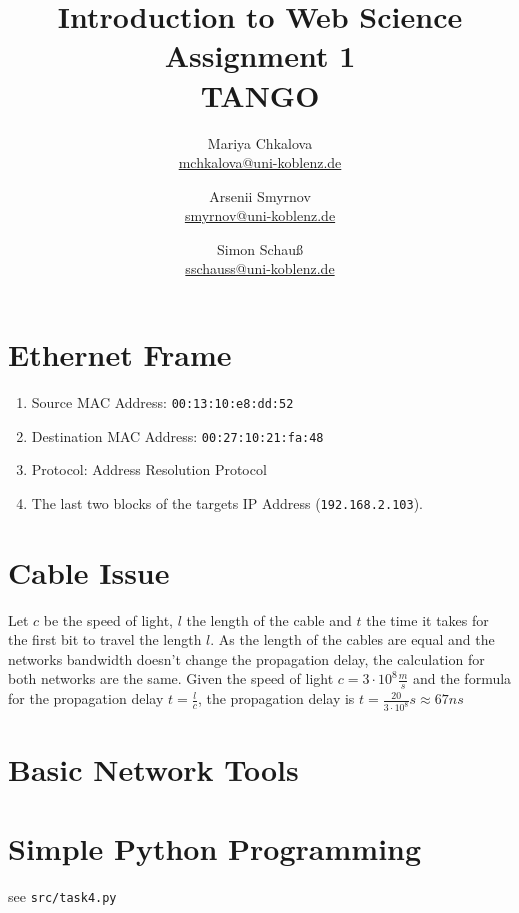 \documentclass[12pt]{article}
\title{
	\Huge{Introduction to Web Science} \\
	\vspace{1em}
	\LARGE{Assignment 1} \\
	\vspace{1em}
	\Large{TANGO}
}
\author {
	Mariya Chkalova \\{\normalsize\href{mailto:mchkalova@uni-koblenz.de}{mchkalova@uni-koblenz.de}} \and
	Arsenii Smyrnov \\{\normalsize\href{mailto:smyrnov@uni-koblenz.de}{smyrnov@uni-koblenz.de}} \and
	Simon Schau\ss \\{\normalsize\href{mailto:sschauss@uni-koblenz.de}{sschauss@uni-koblenz.de}}
}
\date{}
\begin{document}
\maketitle
{}
\newpage


\section{Ethernet Frame}

\begin{enumerate}
	\item Source MAC Address: \texttt{00:13:10:e8:dd:52}
	\item Destination MAC Address: \texttt{00:27:10:21:fa:48}
	\item Protocol: Address Resolution Protocol 
	\item The last two blocks of the targets IP Address (\texttt{192.168.2.103}).
\end{enumerate}

\section{Cable Issue}

Let $c$ be the speed of light, $l$ the length of the cable and $t$ the time it takes for the first bit to travel the length $l$. 
As the length of the cables are equal and the networks bandwidth doesn't change the propagation delay, the calculation for both networks are the same.  
Given the speed of light $c = 3 \cdot 10^8 \frac{m}{s}$ and the formula for the propagation delay $t = \frac{l}{c}$, the propagation delay is $t = \frac{20}{3 \cdot 10^8}s \approx 67ns$

\section{Basic Network Tools}

\section{Simple Python Programming}

see \texttt{src/task4.py}
\end{document}
